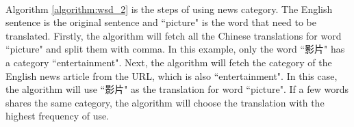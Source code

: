 \\
Algorithm \ref{algorithm:wsd_2} is the steps of using news category. The English sentence is the original sentence and ``picture" is the word that need to be translated. Firstly, the algorithm will fetch all the Chinese translations for word ``picture" and split them with comma. In this example, only the word ``影片" has a category ``entertainment". Next, the algorithm will fetch the category of the English news article from the URL, which is also ``entertainment".
In this case, the algorithm will use ``影片" as the translation for word ``picture". If a few words shares the same category, the algorithm will choose the translation with the highest frequency of use.